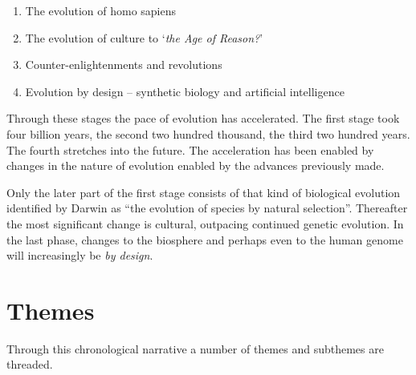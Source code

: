 \documentclass[10pt,titlepage]{book}
\begin{document}
\begin{enumerate}
\item The evolution of homo sapiens
\item The evolution of culture to `\emph{the Age of Reason?}' 
\item Counter-enlightenments and revolutions
\item Evolution by design -- synthetic biology and artificial intelligence
\end{enumerate}

Through these stages the pace of evolution has accelerated.
The first stage took four billion years, the second two hundred thousand, the third two hundred years.
The fourth stretches into the future.
The acceleration has been enabled by changes in the nature of evolution enabled by the advances previously made.

Only the later part of the first stage consists of that kind of biological evolution identified by Darwin as ``the evolution of species by natural selection''.
Thereafter the most significant change is cultural, outpacing continued genetic evolution.
In the last phase, changes to the biosphere and perhaps even to the human genome will increasingly be {\it by design}.

\section{Themes}

Through this chronological narrative a number of themes and subthemes are threaded.
\end{document}
